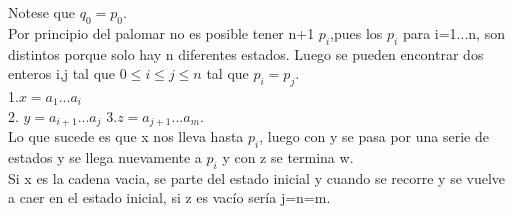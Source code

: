 \documentclass[12pt,a4paper]{article}
\begin{document}
Notese que $q_{0}=p_{0}$.\\
Por principio del palomar no es posible tener n+1 $p_{i}$,pues  los $p_{i}$ para i=1...n, son distintos porque solo hay n diferentes estados.  Luego se pueden encontrar dos enteros i,j tal que $0\leqslant i\leqslant j \leqslant n$ tal que $p_{i}=p_{j}$.\\
1.$x=a_{1}...a_{i}$\\
2. $y=a_{i+1}...a_{j}$
3.$z=a_{j+1}...a_{m}$.\\
Lo que sucede es que x nos lleva hasta $p_{i}$, luego con y se pasa por una serie de estados y se llega nuevamente a $p_{i}$ y con z se termina w.\\
Si x es la cadena vacia, se parte del estado inicial y cuando se recorre y se vuelve a caer en el estado inicial, si z es vac\'io ser\'ia j=n=m.\\ 
\end{document}
